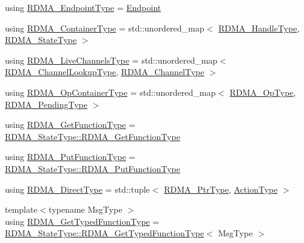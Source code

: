 \begin{DoxyCompactItemize}
\item 
using \hyperlink{structvt_1_1rdma_1_1_r_d_m_a_manager_a106350721a187d2cfb94a9017ef66a07}{R\+D\+M\+A\+\_\+\+Endpoint\+Type} = \hyperlink{structvt_1_1rdma_1_1_endpoint}{Endpoint}
\item 
using \hyperlink{structvt_1_1rdma_1_1_r_d_m_a_manager_a55dd81ff646ebb9d61ebf3a7239ec3b8}{R\+D\+M\+A\+\_\+\+Container\+Type} = std\+::unordered\+\_\+map$<$ \hyperlink{namespacevt_a10442579ec4e7ebef223818e64bcf908}{R\+D\+M\+A\+\_\+\+Handle\+Type}, \hyperlink{structvt_1_1rdma_1_1_r_d_m_a_manager_aad42879902ea82c4de357ad482d9333d}{R\+D\+M\+A\+\_\+\+State\+Type} $>$
\item 
using \hyperlink{structvt_1_1rdma_1_1_r_d_m_a_manager_a689c48ff97319fd83c19e7230b8e9d62}{R\+D\+M\+A\+\_\+\+Live\+Channels\+Type} = std\+::unordered\+\_\+map$<$ \hyperlink{structvt_1_1rdma_1_1_r_d_m_a_manager_a3df5b264f344d9d4530a96264782a725}{R\+D\+M\+A\+\_\+\+Channel\+Lookup\+Type}, \hyperlink{structvt_1_1rdma_1_1_r_d_m_a_manager_ad6a7e417dca07fe5743318e1153677a8}{R\+D\+M\+A\+\_\+\+Channel\+Type} $>$
\item 
using \hyperlink{structvt_1_1rdma_1_1_r_d_m_a_manager_a8c9def755fab6d3eb1f529175243f38a}{R\+D\+M\+A\+\_\+\+Op\+Container\+Type} = std\+::unordered\+\_\+map$<$ \hyperlink{namespacevt_1_1rdma_a9b966d9780a2b41afe7cd7b7b4b20300}{R\+D\+M\+A\+\_\+\+Op\+Type}, \hyperlink{structvt_1_1rdma_1_1_r_d_m_a_manager_a1239149a2070897c56e94e65c2016a7a}{R\+D\+M\+A\+\_\+\+Pending\+Type} $>$
\item 
using \hyperlink{structvt_1_1rdma_1_1_r_d_m_a_manager_a77d00c37a45276b36ef64b9226a8ef0f}{R\+D\+M\+A\+\_\+\+Get\+Function\+Type} = \hyperlink{structvt_1_1rdma_1_1_state_af0baaa6ac5c3b7b256d032f2ee845676}{R\+D\+M\+A\+\_\+\+State\+Type\+::\+R\+D\+M\+A\+\_\+\+Get\+Function\+Type}
\item 
using \hyperlink{structvt_1_1rdma_1_1_r_d_m_a_manager_a714321626dc5613772ac43564c6b7d85}{R\+D\+M\+A\+\_\+\+Put\+Function\+Type} = \hyperlink{structvt_1_1rdma_1_1_state_aa43a5d043fe01086818e9c5c364341d4}{R\+D\+M\+A\+\_\+\+State\+Type\+::\+R\+D\+M\+A\+\_\+\+Put\+Function\+Type}
\item 
using \hyperlink{structvt_1_1rdma_1_1_r_d_m_a_manager_a8bce76d1b441ca17daf84835eb9a7dec}{R\+D\+M\+A\+\_\+\+Direct\+Type} = std\+::tuple$<$ \hyperlink{namespacevt_a9e2c953286c7616f7c218e9951790776}{R\+D\+M\+A\+\_\+\+Ptr\+Type}, \hyperlink{namespacevt_ae0a5a7b18cc99d7b732cb4d44f46b0f3}{Action\+Type} $>$
\item 
{\footnotesize template$<$typename Msg\+Type $>$ }\\using \hyperlink{structvt_1_1rdma_1_1_r_d_m_a_manager_a0d865535d118fe9dcab074fd3df74ce1}{R\+D\+M\+A\+\_\+\+Get\+Typed\+Function\+Type} = \hyperlink{structvt_1_1rdma_1_1_state_a95b006a568982435e63aa18feb5fc202}{R\+D\+M\+A\+\_\+\+State\+Type\+::\+R\+D\+M\+A\+\_\+\+Get\+Typed\+Function\+Type}$<$ Msg\+Type $>$

\end{DoxyCompactItemize}
